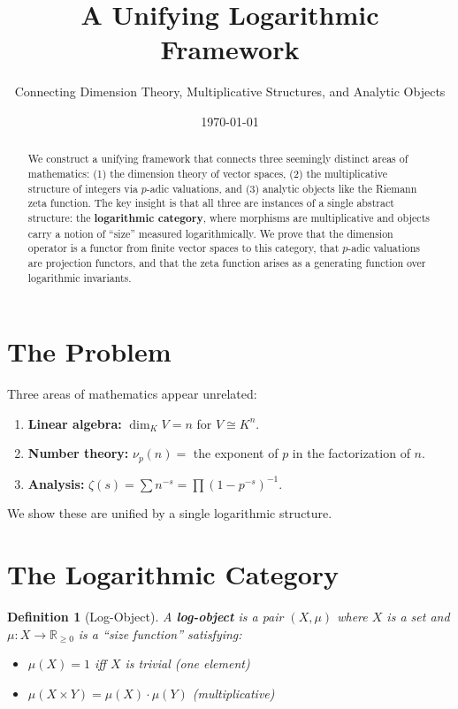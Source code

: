 \documentclass[11pt]{article}
\title{A Unifying Logarithmic Framework}
\author{Connecting Dimension Theory, Multiplicative Structures, and Analytic Objects}
\date{\today}
\newtheorem{definition}{Definition}[section]
\begin{document}
\maketitle

\begin{abstract}
We construct a unifying framework that connects three seemingly distinct areas of mathematics:
(1) the dimension theory of vector spaces,
(2) the multiplicative structure of integers via $p$-adic valuations, and
(3) analytic objects like the Riemann zeta function.
The key insight is that all three are instances of a single abstract structure: the \textbf{logarithmic category}, where morphisms are multiplicative and objects carry a notion of ``size'' measured logarithmically.
We prove that the dimension operator is a functor from finite vector spaces to this category, that $p$-adic valuations are projection functors, and that the zeta function arises as a generating function over logarithmic invariants.
\end{abstract}

\section{The Problem}
\label{sec:problem}

Three areas of mathematics appear unrelated:
\begin{enumerate}
\item \textbf{Linear algebra:} $\dim_K V = n$ for $V \cong K^n$.
\item \textbf{Number theory:} $\nu_p(n) = $ the exponent of $p$ in the factorization of $n$.
\item \textbf{Analysis:} $\zeta(s) = \sum n^{-s} = \prod (1-p^{-s})^{-1}$.
\end{enumerate}

We show these are unified by a single logarithmic structure.

\section{The Logarithmic Category}
\label{sec:category}

\begin{definition}[Log-Object]
A \textbf{log-object} is a pair $(X, \mu)$ where $X$ is a set and $\mu: X \to \mathbb{R}_{\geq 0}$ is a ``size function'' satisfying:
\begin{itemize}
\item $\mu(X) = 1$ iff $X$ is trivial (one element)
\item $\mu(X \times Y) = \mu(X) \cdot \mu(Y)$ (multiplicative)
\end{itemize}
\end{definition}
\end{document}
